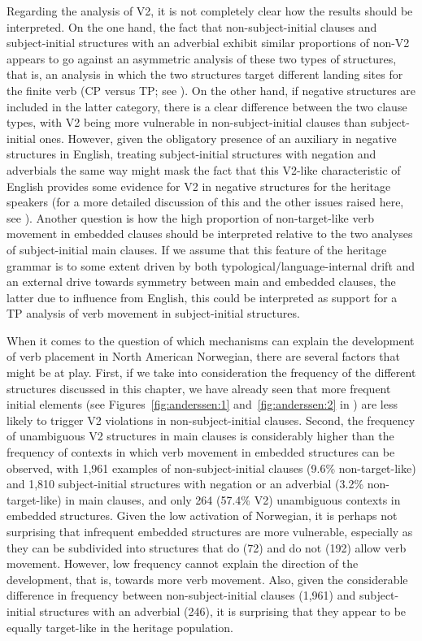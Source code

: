 \documentclass[output=paper]{langscibook}
\begin{document}
Regarding the analysis of V2, it is not completely clear how the results should be interpreted. On the one hand, the fact that non\hyp subject\hyp initial clauses and subject\hyp initial structures with an adverbial exhibit similar proportions of non-V2 appears to go against an asymmetric analysis of these two types of structures, that is, an analysis in which the two structures target different landing sites for the finite verb (CP versus TP; see \citealt{Holmberg2015, WestergaardLohndalAlexiadou2019}). On the other hand, if negative structures are included in the latter category, there is a clear difference between the two clause types, with V2 being more vulnerable in non\hyp subject\hyp initial clauses than subject\hyp initial ones. However, given the obligatory presence of an auxiliary in negative structures in English, treating subject\hyp initial structures with negation and adverbials the same way might mask the fact that this V2-like characteristic of English provides some evidence for V2 in negative structures for the heritage speakers (for a more detailed discussion of this and the other issues raised here, see \citealt{WestergaardEtAl2021}). Another question is how the high proportion of non\hyp target\hyp like verb movement in embedded clauses should be interpreted relative to the two analyses of subject\hyp initial main clauses. If we assume that this feature of the heritage grammar is to some extent driven by both typological\slash language\hyp internal drift and an external drive towards symmetry between main and embedded clauses, the latter due to influence from English, this could be interpreted as support for a TP analysis of verb movement in subject\hyp initial structures.

When it comes to the question of which mechanisms can explain the development of verb placement in North American Norwegian, there are several factors that might be at play. First, if we take into consideration the frequency of the different structures discussed in this chapter, we have already seen that more frequent initial elements (see Figures~\ref{fig:anderssen:1} and~\ref{fig:anderssen:2} in ) are less likely to trigger V2 violations in non\hyp subject\hyp initial clauses. Second, the frequency of unambiguous V2 structures in main clauses is considerably higher than the frequency of contexts in which verb movement in embedded structures can be observed, with 1,961 examples of non\hyp subject\hyp initial clauses (9.6\% non-target-like) and 1,810 subject\hyp initial structures with negation or an adverbial (3.2\% non-target-like) in main clauses, and only 264 (57.4\% V2) unambiguous contexts in embedded structures. Given the low activation of Norwegian, it is perhaps not surprising that infrequent embedded structures are more vulnerable, especially as they can be subdivided into structures that do (72) and do not (192) allow verb movement. However, low frequency cannot explain the direction of the development, that is, towards more verb movement. Also, given the considerable difference in frequency between non\hyp subject\hyp initial clauses (1,961) and subject\hyp initial structures with an adverbial (246), it is surprising that they appear to be equally target\hyp like in the heritage population. 
\end{document}
